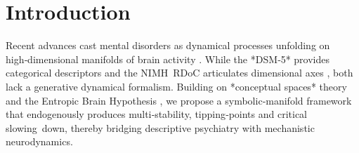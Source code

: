 \section*{Introduction}


Recent advances cast mental disorders as dynamical processes unfolding on high‑dimensional manifolds of brain activity \cite{Borsboom2017}.  While the *DSM‑5* provides categorical descriptors and the NIMH RDoC articulates dimensional axes \cite{Insel2010RDoC}, both lack a generative dynamical formalism.  Building on *conceptual spaces* theory \cite{Gardenfors2000} and the Entropic Brain Hypothesis \cite{CarhartHarris2014}, we propose a symbolic‑manifold framework that endogenously produces multi‑stability, tipping‑points and critical slowing down, thereby bridging descriptive psychiatry with mechanistic neurodynamics.

